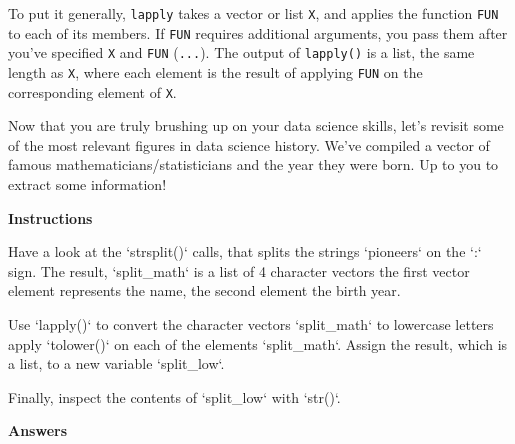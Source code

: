 \documentclass[]{article}
\newcommand{\hlnum}[1]{\textcolor[rgb]{0.816,0.125,0.439}{#1}}%
\newcommand{\hlstr}[1]{\textcolor[rgb]{0.251,0.627,0.251}{#1}}%
\newcommand{\hlstd}[1]{\textcolor[rgb]{0.251,0.251,0.251}{#1}}%
\newcommand{\hlkwc}[1]{\textcolor[rgb]{0.251,0.251,0.251}{#1}}%
\newenvironment{Shaded}{\begin{myshaded}}{\end{myshaded}}
\newcommand{\DataTypeTok}[1]{\hlkwc{#1}}
\newcommand{\DecValTok}[1]{\hlnum{#1}}
\newcommand{\StringTok}[1]{\hlstr{#1}}
\newcommand{\NormalTok}[1]{\hlstd{#1}}
\begin{document}
To put it generally, \texttt{lapply} takes a vector or list \texttt{X},
and applies the function \texttt{FUN} to each of its members. If
\texttt{FUN} requires additional arguments, you pass them after you've
specified \texttt{X} and \texttt{FUN} (\texttt{...}). The output of
\texttt{lapply()} is a list, the same length as \texttt{X}, where each
element is the result of applying \texttt{FUN} on the corresponding
element of \texttt{X}.

Now that you are truly brushing up on your data science skills, let's
revisit some of the most relevant figures in data science history. We've
compiled a vector of famous mathematicians/statisticians and the year
they were born. Up to you to extract some information!

\textbf{Instructions}

\begin{Shaded}
\begin{Highlighting}[]
\OperatorTok{*}\StringTok{ }\NormalTok{Have a look at the }\StringTok{`}\DataTypeTok{strsplit()}\StringTok{`}\NormalTok{ calls, that splits the strings } \StringTok{`}\DataTypeTok{pioneers}\StringTok{`}\NormalTok{ on the }\StringTok{`}\DataTypeTok{:}\StringTok{`}\NormalTok{ sign. The result, }\StringTok{`}\DataTypeTok{split_math}\StringTok{`}\NormalTok{ is a list of }\DecValTok{4}\NormalTok{ character vectors}\OperatorTok{:}\StringTok{ }\NormalTok{the first vector element represents the name, the second element the birth year.}

\OperatorTok{*}\StringTok{ }\NormalTok{Use }\StringTok{`}\DataTypeTok{lapply()}\StringTok{`}\NormalTok{ to convert the character vectors } \StringTok{`}\DataTypeTok{split_math}\StringTok{`}\NormalTok{ to lowercase letters}\OperatorTok{:}\StringTok{ }\NormalTok{apply }\StringTok{`}\DataTypeTok{tolower()}\StringTok{`}\NormalTok{ on each of the elements } \StringTok{`}\DataTypeTok{split_math}\StringTok{`}\NormalTok{. Assign the result, which is a list, to a new variable }\StringTok{`}\DataTypeTok{split_low}\StringTok{`}\NormalTok{.}

\OperatorTok{*}\StringTok{ }\NormalTok{Finally, inspect the contents of }\StringTok{`}\DataTypeTok{split_low}\StringTok{`}\NormalTok{ with }\StringTok{`}\DataTypeTok{str()}\StringTok{`}\NormalTok{.}
\end{Highlighting}
\end{Shaded}

\textbf{Answers}
\end{document}
